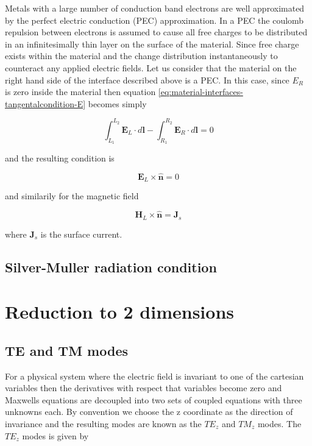 Metals with a large number of conduction band electrons are well approximated by the perfect electric conduction (PEC) approximation. In a PEC the coulomb repulsion between electrons is assumed to cause all free charges to be distributed in an infinitesimally thin layer on the surface of the material. Since free charge exists within the material and the change distribution instantaneously to counteract any applied electric fields. Let us consider that the material on the right hand side of the interface described above is a PEC. In this case, since $E_R$ is zero inside the material then equation \eqref{eq:material-interfaces-tangentalcondition-E} becomes simply

$$
\int_{L_1}^{L_2} \mathbf{E}_L \cdot d\mathbf{l} - \int_{R_1}^{R_2} \mathbf{E}_R \cdot d \mathbf{l} = 0
$$

and the resulting condition is

$$
\mathbf{E}_L \times \hat{\mathbf{n}} = 0
$$

and similarily for the magnetic field

$$
\mathbf{H}_L \times \hat{\mathbf{n}} = \mathbf{J}_s
$$

where $\mathbf{J}_s$ is the surface current.

\subsection{Silver-Muller radiation condition}

\section{Reduction to 2 dimensions}

\subsection{TE and TM modes}
For a physical system where the electric field is invariant to one of the cartesian variables then the derivatives with respect that variables become zero and Maxwells equations are decoupled into two sets of coupled equations with three unknowns each. By convention we choose the z coordinate as the direction of invariance and the resulting modes are known as the $TE_z$ and $TM_z$ modes. The $TE_z$ modes is given by

